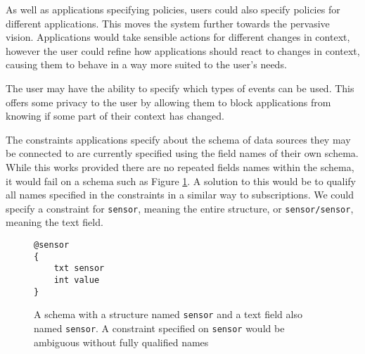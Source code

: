 \documentclass[12pt,twoside,notitlepage]{report}
\begin{document}
As well as applications specifying policies, users could also specify policies for different applications. 
This moves the system further towards the pervasive vision. 
Applications would take sensible actions for different changes in context, however the user could refine how applications should react to changes in context, causing them to behave in a way more suited to the user's needs.

The user may have the ability to specify which types of events can be used. 
This offers some privacy to the user by allowing them to block applications from knowing if some part of their context has changed.

The constraints applications specify about the schema of data sources they may be connected to are currently specified using the field names of their own schema.
While this works provided there are no repeated fields names within the schema, it would fail on a schema such as Figure \ref{fig:repeatednameschema}. 
A solution to this would be to qualify all names specified in the constraints in a similar way to subscriptions. 
We could specify a constraint for {\tt sensor}, meaning the entire structure, or {\tt sensor/sensor}, meaning the text field.

\begin{figure}[tbh]
\begin{lstlisting}
@sensor
{
	txt sensor
	int value
}
\end{lstlisting}
\caption[Schema with repeated name]{A schema with a structure named {\tt sensor} and a text field also named {\tt sensor}. A constraint specified on {\tt sensor} would be ambiguous without fully qualified names}
\label{fig:repeatednameschema}
\end{figure}

\cleardoublepage


\nocite{*}

\cleardoublepage
\end{document}
